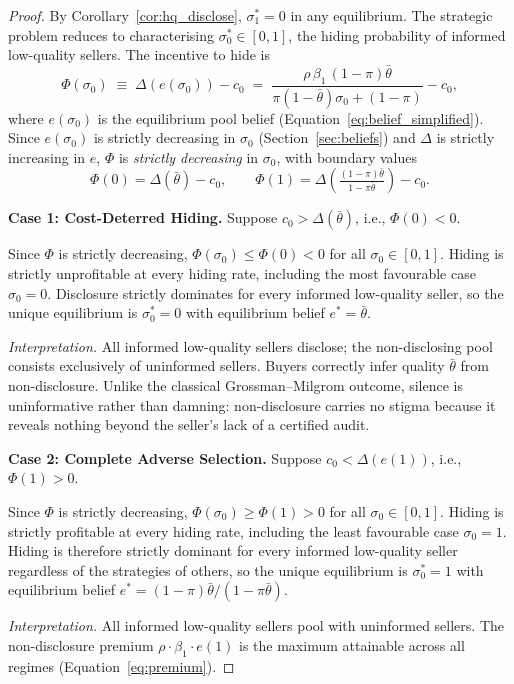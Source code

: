 \documentclass[10pt,letterpaper]{bp-template-concise}
\begin{document}
\begin{proof}
By Corollary~\ref{cor:hq_disclose}, $\sigma_1^* = 0$ in any equilibrium. The strategic problem reduces to characterising $\sigma_0^* \in [0,1]$, the hiding probability of informed low-quality sellers. The incentive to hide is
\[
    \Phi(\sigma_0) \;\equiv\; \Delta\!\left(e(\sigma_0)\right) - c_0
    \;=\; \frac{\rho\,\beta_1\,(1-\pi)\bar{\theta}}{\pi(1-\bar{\theta})\sigma_0 + (1-\pi)} - c_0,
\]
where $e(\sigma_0)$ is the equilibrium pool belief (Equation~\eqref{eq:belief_simplified}). Since $e(\sigma_0)$ is strictly decreasing in $\sigma_0$ (Section~\ref{sec:beliefs}) and $\Delta$ is strictly increasing in $e$, $\Phi$ is \emph{strictly decreasing} in $\sigma_0$, with boundary values
\[
    \Phi(0) = \Delta(\bar{\theta}) - c_0, \qquad
    \Phi(1) = \Delta\!\left(\tfrac{(1-\pi)\bar{\theta}}{1-\pi\bar{\theta}}\right) - c_0.
\]

\medskip
\textbf{Case 1: Cost-Deterred Hiding.} Suppose $c_0 > \Delta(\bar{\theta})$, i.e., $\Phi(0) < 0$.

Since $\Phi$ is strictly decreasing, $\Phi(\sigma_0) \leq \Phi(0) < 0$ for all $\sigma_0 \in [0,1]$. Hiding is strictly unprofitable at every hiding rate, including the most favourable case $\sigma_0 = 0$. Disclosure strictly dominates for every informed low-quality seller, so the unique equilibrium is $\sigma_0^* = 0$ with equilibrium belief $e^* = \bar{\theta}$.

\textit{Interpretation.} All informed low-quality sellers disclose; the non-disclosing pool consists exclusively of uninformed sellers. Buyers correctly infer quality $\bar{\theta}$ from non-disclosure. Unlike the classical Grossman--Milgrom outcome, silence is uninformative rather than damning: non-disclosure carries no stigma because it reveals nothing beyond the seller's lack of a certified audit.

\medskip
\textbf{Case 2: Complete Adverse Selection.} Suppose $c_0 < \Delta(e(1))$, i.e., $\Phi(1) > 0$.

Since $\Phi$ is strictly decreasing, $\Phi(\sigma_0) \geq \Phi(1) > 0$ for all $\sigma_0 \in [0,1]$. Hiding is strictly profitable at every hiding rate, including the least favourable case $\sigma_0 = 1$. Hiding is therefore strictly dominant for every informed low-quality seller regardless of the strategies of others, so the unique equilibrium is $\sigma_0^* = 1$ with equilibrium belief $e^* = (1-\pi)\bar{\theta}/(1-\pi\bar{\theta})$.

\textit{Interpretation.} All informed low-quality sellers pool with uninformed sellers. The non-disclosure premium $\rho\cdot\beta_1\cdot e(1)$ is the maximum attainable across all regimes (Equation~\eqref{eq:premium}).


\end{proof}
\end{document}

